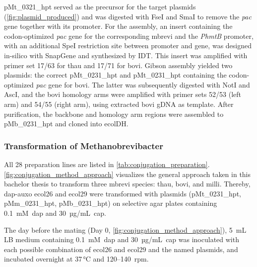 pMt\_0321\_hpt served as the precursor for the target plasmids (\cref{fig:plasmid_produced}) and was digested with FseI and SmaI to remove the \textit{pac} gene together with its promoter. For the assembly, an insert containing the codon-optimized \textit{pac} gene for the corresponding \acrlong{mbrevi} and the \textit{PhmtB} promoter, with an additional SpeI restriction site between promoter and gene, was designed in-silico with SnapGene and synthesized by IDT. This insert was amplified with primer set 17/63 for \acrshort{thau} and 17/71 for \acrshort{bovi}.
Gibson assembly yielded two plasmids: the correct pMt\_0231\_hpt and pMt\_0231\_hpt containing the codon-optimized \textit{pac} gene for \acrshort{bovi}. The latter was subsequently digested with NotI and AscI, and the \acrshort{bovi} homology arms were amplified with primer sets 52/53 (left arm) and 54/55 (right arm), using extracted \acrshort{bovi} gDNA as template. After purification, the backbone and homology arm regions were assembled to pMb\_0231\_hpt and cloned into \acrshort{ecolDH}.






\subsubsection{Transformation of \textup{Methanobrevibacter}}
\label{sec:method_conjug_trafo}


All 28 preparation lines are listed in \cref{tab:conjugation_preparation}. \cref{fig:conjugation_method_approach} visualizes the general approach taken in this bachelor thesis to transform three \acrlong{mbrevi} species: \acrshort{thau}, \acrshort{bovi}, and \acrshort{milli}.
Thereby, \acrshort{dap}-\gls{auxo} \acrshort{ecol26} and \acrshort{ecol29} were transformed with plasmids (pMt\_0231\_hpt, pMm\_0231\_hpt, pMb\_0231\_hpt) on selective agar plates containing 0.1~mM~\acrshort{dap} and 30~µg/mL~\acrshort{cap}. 

The day before the mating (Day 0, \cref{fig:conjugation_method_approach}), 5~mL LB medium containing 0.1~mM~\acrshort{dap} and 30~µg/mL~\acrshort{cap} was inoculated with each possible combination of \acrshort{ecol26} and \acrshort{ecol29} and the named plasmids, and incubated overnight at 37\,°C and 120--140~rpm.

